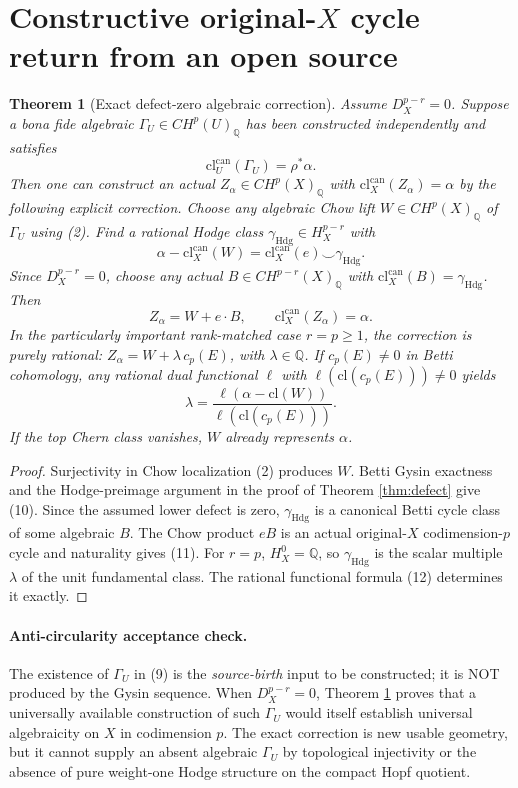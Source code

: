 \documentclass[11pt]{article}
\newtheorem{theorem}{Theorem}
\begin{document}
\section{Constructive original-$X$ cycle return from an open source}
\begin{theorem}[Exact defect-zero algebraic correction]\label{thm:return}
Assume $D_X^{p-r}=0$. Suppose a bona fide algebraic
$\Gamma_U\in CH^p(U)_{\mathbb Q}$ has been constructed
\emph{independently} and satisfies
\[
 \mathrm{cl}^{\mathrm{can}}_U(\Gamma_U)=\rho^*\alpha.
                                                               \tag{9}
\]
Then one can construct an actual
$Z_\alpha\in CH^p(X)_{\mathbb Q}$
with $\mathrm{cl}^{\mathrm{can}}_X(Z_\alpha)=\alpha$
by the following explicit correction.
Choose any algebraic Chow lift $W\in CH^p(X)_{\mathbb Q}$
of $\Gamma_U$ using (2).
Find a rational Hodge class $\gamma_{\mathrm{Hdg}}
 \in H_X^{p-r}$ with
\[
 \alpha-\mathrm{cl}^{\mathrm{can}}_X(W)
  =\mathrm{cl}^{\mathrm{can}}_X(e)\smile\gamma_{\mathrm{Hdg}}.
                                                               \tag{10}
\]
Since $D_X^{p-r}=0$, choose any actual
$B\in CH^{p-r}(X)_{\mathbb Q}$ with
$\mathrm{cl}^{\mathrm{can}}_X(B)=\gamma_{\mathrm{Hdg}}$.
Then
\[
 \boxed{Z_\alpha=W+e\cdot B,\qquad
          \mathrm{cl}^{\mathrm{can}}_X(Z_\alpha)=\alpha.}   \tag{11}
\]
In the particularly important rank-matched case $r=p\ge1$,
the correction is purely rational:
$Z_\alpha=W+\lambda\,c_p(E)$, with $\lambda\in\mathbb Q$.
If $c_p(E)\ne0$ in Betti cohomology, any rational dual functional
$\ell$ with $\ell(\mathrm{cl}(c_p(E)))\ne0$ yields
\[
 \lambda=\frac{\ell(\alpha-\mathrm{cl}(W))}
                {\ell(\mathrm{cl}(c_p(E)))}.                \tag{12}
\]
If the top Chern class vanishes, $W$ already represents $\alpha$.
\end{theorem}
\begin{proof}
Surjectivity in Chow localization (2) produces $W$.
Betti Gysin exactness and the Hodge-preimage argument in the proof
of Theorem \ref{thm:defect} give (10). Since the assumed lower
defect is zero, $\gamma_{\mathrm{Hdg}}$ is a canonical Betti cycle
class of some algebraic $B$. The Chow product $eB$ is an
actual original-$X$ codimension-$p$ cycle and naturality gives
(11). For $r=p$, $H_X^0=\mathbb Q$, so $\gamma_{\mathrm{Hdg}}$
is the scalar multiple $\lambda$ of the unit fundamental class.
The rational functional formula (12) determines it exactly.
\end{proof}

\paragraph{Anti-circularity acceptance check.}
The existence of $\Gamma_U$ in (9) is the \emph{source-birth}
input to be constructed; it is NOT produced by the Gysin sequence.
When $D_X^{p-r}=0$, Theorem \ref{thm:return} proves
that a universally available construction of such $\Gamma_U$
would itself establish universal algebraicity on $X$ in
codimension $p$. The exact correction is new usable geometry,
but it cannot supply an absent algebraic $\Gamma_U$ by
topological injectivity or the absence of pure weight-one
Hodge structure on the compact Hopf quotient.
\end{document}
